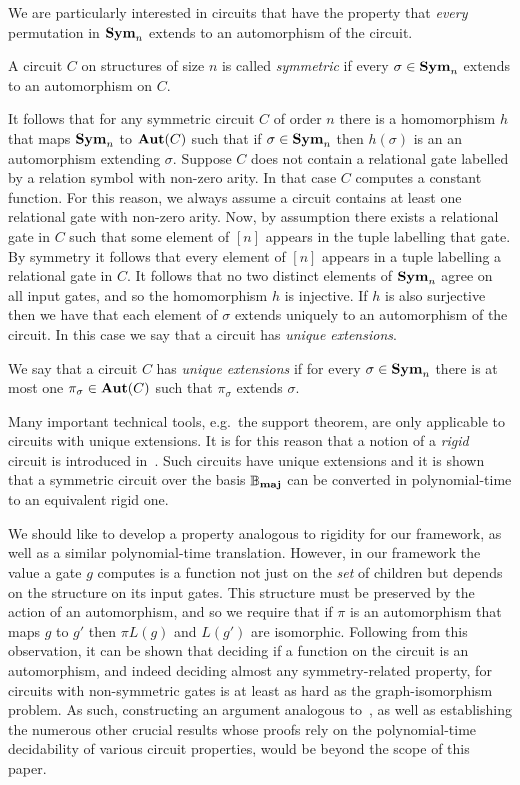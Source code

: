 \documentclass[a4paper,UKenglish]{lipics-v2018}
\begin{document}
We are particularly interested in circuits that have the property that
\emph{every} permutation in $\text{\textbf{Sym}}_n$ extends to an automorphism of the circuit.

\begin{definition}[Symmetry]
  A circuit $C$ on structures of size $n$ is called \emph{symmetric} if every
  $\sigma \in \text{\textbf{Sym}}_n$ extends to an automorphism on $C$.
\end{definition}

It follows that for any symmetric circuit $C$ of order $n$ there is a
homomorphism $h$ that maps $\text{\textbf{Sym}}_n$ to $\text{\textbf{Aut}}(C)$ such that if $\sigma \in
\text{\textbf{Sym}}_n$ then $h(\sigma)$ is an an automorphism extending $\sigma$. Suppose $C$
does not contain a relational gate labelled by a relation symbol with non-zero
arity. In that case $C$ computes a constant function. For this reason, we always
assume a circuit contains at least one relational gate with non-zero arity. Now,
by assumption there exists a relational gate in $C$ such that some element of
$[n]$ appears in the tuple labelling that gate. By symmetry it follows that
every element of $[n]$ appears in a tuple labelling a relational gate in $C$. It
follows that no two distinct elements of $\text{\textbf{Sym}}_n$ agree on all input gates, and
so the homomorphism $h$ is injective. If $h$ is also surjective then we have
that each element of $\sigma$ extends uniquely to an automorphism of the
circuit. In this case we say that a circuit has \emph{unique extensions}.

\begin{definition}
  We say that a circuit $C$ has \emph{unique extensions} if for every $\sigma
  \in \text{\textbf{Sym}}_n$ there is at most one $\pi_{\sigma} \in \text{\textbf{Aut}}(C)$ such that
  $\pi_{\sigma}$ extends $\sigma$.
\end{definition}

Many important technical tools, e.g.\ the support theorem, are only applicable
to circuits with unique extensions. It is for this reason that a notion of a
\emph{rigid} circuit is introduced in~\cite{AndersonD17}. Such circuits have
unique extensions and it is shown that a symmetric circuit over the basis $\mathbb{B}_{\text{\textbf{maj}}}$
can be converted in polynomial-time to an equivalent rigid one.

We should like to develop a property analogous to rigidity for our framework, as
well as a similar polynomial-time translation. However, in our framework the
value a gate $g$ computes is a function not just on the \emph{set} of children
but depends on the structure on its input gates. This structure must be
preserved by the action of an automorphism, and so we require that if $\pi$ is
an automorphism that maps $g$ to $g'$ then $\pi L(g)$ and $L(g')$ are
isomorphic. Following from this observation, it can be shown that deciding if a
function on the circuit is an automorphism, and indeed deciding almost any
symmetry-related property, for circuits with non-symmetric gates is at least as
hard as the graph-isomorphism problem. As such, constructing an argument
analogous to~\cite{AndersonD17}, as well as establishing the numerous other
crucial results whose proofs rely on the polynomial-time decidability of various
circuit properties, would be beyond the scope of this paper.
\end{document}
